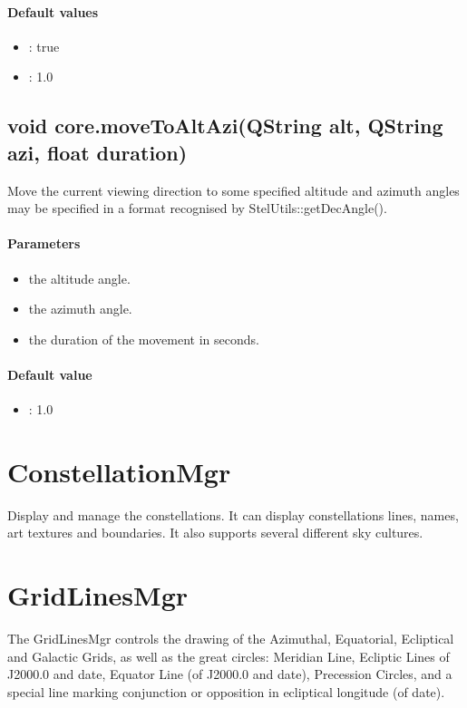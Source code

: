 \paragraph{Default values}
\begin{itemize}
\item {}: true
\item {}: 1.0
\end{itemize}

\subsection{void core.moveToAltAzi(QString alt, QString azi, float duration)}
\label{sec:ScriptingAPI:core:moveToAltAzi}
Move the current viewing direction to some specified altitude and azimuth angles may be specified in a format recognised by StelUtils::getDecAngle().

\paragraph{Parameters}
\begin{itemize}
\item {} the altitude angle.
\item {} the azimuth angle.
\item {} the duration of the movement in seconds.
\end{itemize}

\paragraph{Default value}
\begin{itemize}
\item {}: 1.0
\end{itemize}

\section{ConstellationMgr}
\label{sec:ScriptingAPI:ConstellationMgr}
Display and manage the constellations. It can display constellations lines, names, art textures and boundaries. It also supports several different sky cultures.

\section{GridLinesMgr}
\label{sec:ScriptingAPI:GridLinesMgr}
The GridLinesMgr controls the drawing of the Azimuthal, Equatorial, Ecliptical and Galactic Grids, as well as the great circles: Meridian Line, Ecliptic Lines of J2000.0 and date, Equator Line (of J2000.0 and date), Precession Circles, and a special line marking conjunction or opposition in ecliptical longitude (of date).

